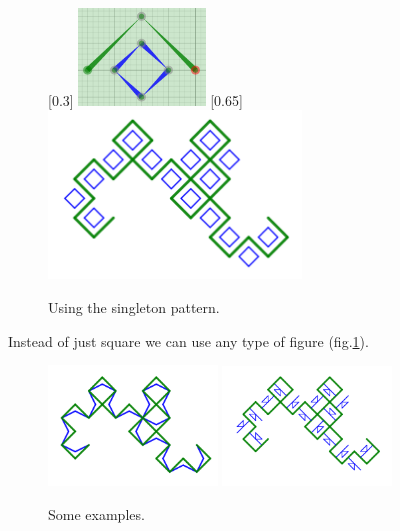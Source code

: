         \begin{figure}[ht]
            \caption{Using the singleton pattern.}
            \centering
            [0.3\textwidth]
                {\includegraphics[width=0.3\textwidth]{img/Simple_Techniques/Singleton/simple_single_setup_03.png}}
            [0.65\textwidth]
                {\includegraphics[width=0.6\textwidth]{img/Simple_Techniques/Singleton/simple_single_02.png}}
        \end{figure}

        \FloatBarrier

        Instead of just square we can use any type of figure (fig.\ref{simple_single_05}).

        \begin{figure}[ht]
            \caption{\label{simple_single_05} Some examples.}
            \centering
            \includegraphics[width=0.4\textwidth]{img/Simple_Techniques/Singleton/simple_single_03.png}
            \includegraphics[width=0.4\textwidth]{img/Simple_Techniques/Singleton/simple_single_04.png}
        \end{figure}

